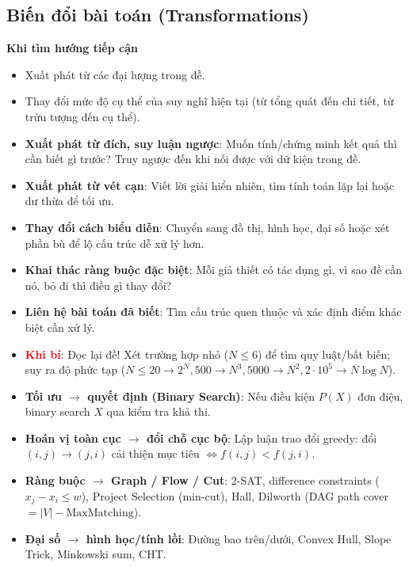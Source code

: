 \subsection{Biến đổi bài toán (Transformations)}
\noindent\textbf{Khi tìm hướng tiếp cận}
\begin{itemize}
    \setlength{\itemsep}{0pt}
    \setlength{\parsep}{0pt}
    \setlength{\topsep}{0pt}
    \item Xuất phát từ các đại lượng trong đề.
    \item Thay đổi mức độ cụ thể của suy nghĩ hiện tại (từ tổng quát đến chi tiết, từ trừu tượng đến cụ thể).
    \item \textbf{Xuất phát từ đích, suy luận ngược}: Muốn tính/chứng minh kết quả thì cần biết gì trước? Truy ngược đến khi nối được với dữ kiện trong đề.
    \item \textbf{Xuất phát từ vét cạn}: Viết lời giải hiển nhiên, tìm tính toán lặp lại hoặc dư thừa để tối ưu.
    \item \textbf{Thay đổi cách biểu diễn}: Chuyển sang đồ thị, hình học, đại số hoặc xét phần bù để lộ cấu trúc dễ xử lý hơn.
    \item \textbf{Khai thác ràng buộc đặc biệt}: Mỗi giả thiết có tác dụng gì, vì sao đề cần nó, bỏ đi thì điều gì thay đổi?
    \item \textbf{Liên hệ bài toán đã biết}: Tìm cấu trúc quen thuộc và xác định điểm khác biệt cần xử lý.
    \setlength{\parsep}{0pt}
    \item \textcolor{red}{\textbf{Khi bí}}: Đọc lại đề! Xét trường hợp nhỏ ($N\le6$) để tìm quy luật/bất biến; suy ra độ phức tạp ($N\le20\to2^N,500\to N^3,5000\to N^2,2\cdot10^5\to N\log N$).

    \item \textbf{Tối ưu $\to$ quyết định (Binary Search)}: Nếu điều kiện $P(X)$ đơn điệu, binary search $X$ qua kiểm tra khả thi.

    \item \textbf{Hoán vị toàn cục $\to$ đổi chỗ cục bộ}: Lập luận trao đổi greedy: đổi $(i,j)\to(j,i)$ cải thiện mục tiêu $\iff f(i,j)<f(j,i)$.

    \item \textbf{Ràng buộc $\to$ Graph / Flow / Cut}: 2-SAT, difference constraints ($x_j-x_i\le w$), Project Selection (min-cut), Hall, Dilworth (DAG path cover $=|V|-\text{MaxMatching}$).

    \item \textbf{Đại số $\to$ hình học/tính lồi}: Đường bao trên/dưới, Convex Hull, Slope Trick, Minkowski sum, CHT.


\end{itemize}
